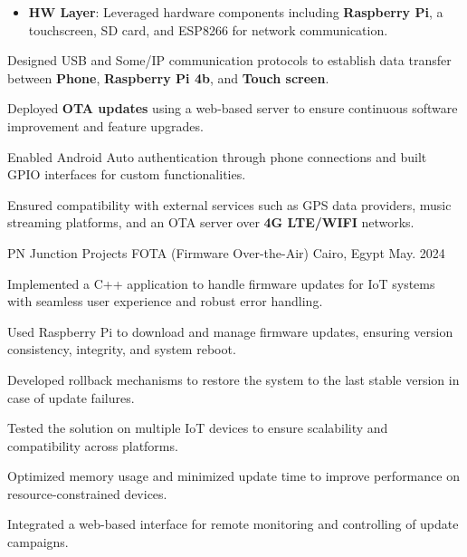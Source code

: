 \begin{cventries}
{\begin{cvitems}
{\begin{itemize}
        \item \textbf{HW Layer}: Leveraged hardware components including \textbf{Raspberry Pi}, a touchscreen, SD card, and ESP8266 for network communication.
      \end{itemize}
    }
    \item {Designed USB and Some/IP communication protocols to establish data transfer between \textbf{Phone}, \textbf{Raspberry Pi 4b}, and \textbf{Touch screen}.}
    \item {Deployed \textbf{OTA updates} using a web-based server to ensure continuous software improvement and feature upgrades.}
    \item {Enabled Android Auto authentication through phone connections and built GPIO interfaces for custom functionalities.}
    \item {Ensured compatibility with external services such as GPS data providers, music streaming platforms, and an OTA server over \textbf{4G LTE/WIFI} networks.}
  \end{cvitems}
}
\cventry
{\normalsize  PN Junction Projects } %
{\Large FOTA (Firmware Over-the-Air) } %
{\normalsize Cairo, Egypt} %
{\normalsize May. 2024} %
{
  \begin{cvitems} %
     \item {Implemented a C++ application to handle firmware updates for IoT systems with seamless user experience and robust error handling.}
    \item {Used Raspberry Pi to download and manage firmware updates, ensuring version consistency, integrity, and system reboot.}
    \item {Developed rollback mechanisms to restore the system to the last stable version in case of update failures.}
    \item {Tested the solution on multiple IoT devices to ensure scalability and compatibility across platforms.}
    \item {Optimized memory usage and minimized update time to improve performance on resource-constrained devices.}
    \item {Integrated a web-based interface for remote monitoring and controlling of update campaigns.}
  \end{cvitems}
}

\end{cventries}
